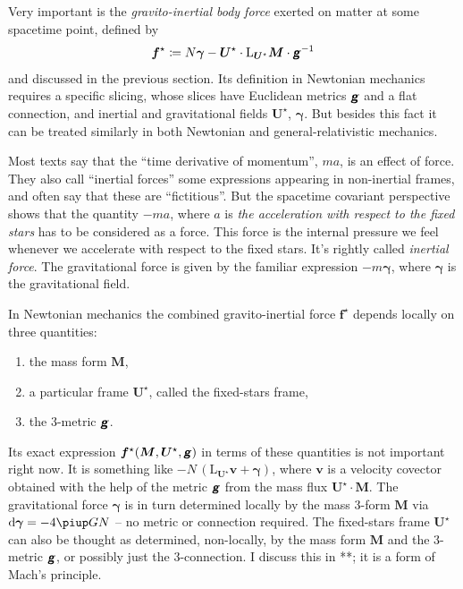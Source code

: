 \documentclass[\ifafour a4paper,12pt,\else a5paper,10pt,\fi%
onecolumn,oneside,article,%
british%
]{memoir}
\theoremstyle{remark}
\theoremstyle{innote}
\newcommand*{\mathte}[1]{\textbf{\textit{\textsf{#1}}}}
\newcommand*{\de}{\partialup}%
\newcommand*{\pu}{\piup}%
\newcommand*{\di}{\mathrm{d}}%
\newcommand*{\defd}{\coloneqq}
\renewcommand*{\|}[1][]{\nonscript\,#1\vert\nonscript\;\mathopen{}}
\newcommand*{\puzzle}{{\fontencoding{U}\fontfamily{fontawesometwo}\selectfont\symbol{225}}}
\newcommand*{\psect}{{\footnotesize\puzzle}}%
\newcommand*{\Li}{\mathrm{L}}
\newcommand*{\yd}{N}
\newcommand*{\yrr}{M}
\newcommand*{\yr}{\bm{\yrr}}
\newcommand*{\ybb}{f}
\newcommand*{\yb}{\bm{\ybb}}
\newcommand*{\ybi}{\yb^{\mathord{\star}}}
\newcommand*{\yxxt}{x}
\newcommand*{\yxt}{\bm{\yxxt}}
\newcommand*{\yxto}{\bm{\yxxt}^{\mathord{\star}}}
\newcommand*{\yvvt}{v}
\newcommand*{\yvt}{\bm{\yvvt}}
\newcommand*{\yffg}{\gamma}
\newcommand*{\yfg}{\bm{\yffg}}
\newcommand*{\yomm}{\varOmega}
\newcommand*{\yom}{\bm{\yomm}^{\mathord{\star}}}
\newcommand*{\yFF}{U}
\newcommand*{\yF}{\bm{\yFF}}
\newcommand*{\yFi}{\yF^{\mathord{\star}}}
\newcommand*{\ygg}{g}
\newcommand*{\yg}{\mathte{\ygg}}
\begin{document}
Very important is the \emph{gravito-inertial body force} exerted on matter at some spacetime point, defined by 
\begin{equation}
  \label{eq:gravito-inertial_force_tentative}
  \ybi \defd \yd\yfg - \yFi \cdot \Li_{\yFi}\yr \cdot \yg^{-1}
\end{equation}
and discussed in the previous section. Its definition in Newtonian
mechanics requires a specific slicing, whose slices have Euclidean
metrics $\yg$ and a flat connection, and inertial and gravitational fields
$\yFi$, $\yfg$. But besides this fact it can be treated similarly in both
Newtonian and general-relativistic mechanics.

Most texts say that the \enquote{time derivative of momentum}, $ma$, is an
effect of force. They also call \enquote{inertial forces} some expressions
appearing in non-inertial frames, and often say that these are
\enquote{fictitious}. But the spacetime covariant perspective shows that
the quantity $-ma$, where $a$ is \emph{the acceleration with respect to the
  fixed stars} has to be considered as a force. This force is the internal
pressure we feel whenever we accelerate with respect to the fixed stars.
It's rightly called \emph{inertial force}. The gravitational force is given
by the familiar expression $-m \yfg$, where $\yfg$ is the gravitational
field.


In Newtonian mechanics the combined gravito-inertial force $\ybi$ depends
locally on three quantities:
\begin{enumerate}[label=(\arabic*)]\tightlist
\item the mass form $\yr$,
\item a particular frame $\yFi$, called the fixed-stars frame,
\item the 3-metric $\yg$.
\end{enumerate}
Its exact expression $\ybi(\yr,\yFi,\yg)$ in terms of these quantities is
not important right now. It is something like
$-\yd \,(\Li_{\yFi}\yvt + \yfg)$, where $\yvt$ is a velocity covector
obtained with the help of the metric $\yg$ from the mass flux
$\yFi\cdot\yr$. The gravitational force $\yfg$ is in turn determined
locally by the mass 3-form $\yr$ via $\di\yfg = - 4\pu G \yd$ -- no metric
or connection required. The fixed-stars frame $\yFi$ can also be thought as
determined, non-locally, by the mass form $\yr$ and the 3-metric $\yg$, or
possibly just the 3-connection. I discuss this in \psect**; it is a form of
Mach's principle.
\end{document}
